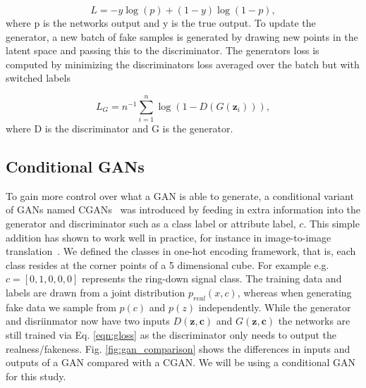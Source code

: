 \documentclass[12pt]{iopart}
\begin{document}
\begin{equation}
    L = -y \log(p) + (1 - y) \log(1-p),
    \label{eqn:gloss}
\end{equation}
where p is the networks output and y is the true output. 
To update the generator, a new batch of fake samples is generated by drawing new points in the latent space and passing this to the discriminator. The generators loss is computed by minimizing the discriminators loss averaged over the batch but with switched labels 

\begin{equation}
    L_{G} = n^{-1} \sum\limits_{i=1}^n \log(1-D(G(\mathbf{z}_{i}))),
\end{equation}
where D is the discriminator and G is the generator.
\subsection{Conditional GANs}

%
To gain more control over what a GAN is able to generate, a conditional variant
of \acp{GAN} named \acp{CGAN}~\cite{cgan} was introduced by feeding in extra
information into the generator and discriminator such as a class label or
attribute label, $c$. This simple addition has shown to work well in practice, for instance in image-to-image translation~\cite{isola2016imagetoimage}. We defined the classes in one-hot encoding framework, that is, each class resides at the corner points of a 5 dimensional cube. For example e.g. $c=[0,1,0,0,0]$ represents the ring-down signal class. The training data and labels are drawn from a joint distribution $p_{real}(x,c)$, whereas when generating fake data we sample from $p(c)$ and $p(z)$ independently. While the generator and disriinmator now have two inputs $D(\mathbf{z},\mathbf{c})$ and $G(\mathbf{z},\mathbf{c})$ the networks are still trained via Eq. \eqref{eqn:gloss} as the discriminator only needs to output the realness/fakeness. 
Fig. \ref{fig:gan_comparison} shows the differences in inputs and outputs of a GAN compared with a \ac{CGAN}. We will be using a conditional GAN for this study.
\end{document}
